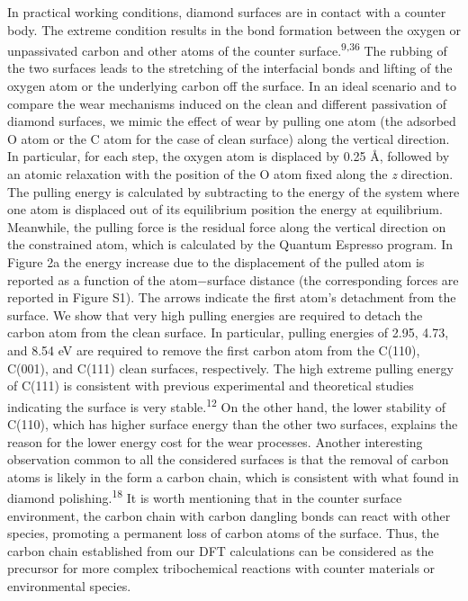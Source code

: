 \documentclass{article}
\begin{document}
In practical working conditions, diamond surfaces are in contact with a counter body. The extreme condition results in the bond formation between the oxygen or unpassivated carbon and other atoms of the counter surface.\textsuperscript{9,36} The rubbing of the two surfaces leads to the stretching of the interfacial bonds and lifting of the oxygen atom or the underlying carbon off the surface. In an ideal scenario and to compare the wear mechanisms induced on the clean and different passivation of diamond surfaces, we mimic the effect of wear by pulling one atom (the adsorbed O atom or the C atom for the case of clean surface) along the vertical direction. In particular, for each step, the oxygen atom is displaced by 0.25 Å, followed by an atomic relaxation with the position of the O atom fixed along the \textit{z} direction. The pulling energy is calculated by subtracting to the energy of the system where one atom is displaced out of its equilibrium position the energy at equilibrium. Meanwhile, the pulling force is the residual force along the vertical direction on the constrained atom, which is calculated by the Quantum Espresso program. In Figure 2a the energy increase due to the displacement of the pulled atom is reported as a function of the atom−surface distance (the corresponding forces are reported in Figure S1). The arrows indicate the first atom’s detachment from the surface. We show that very high pulling energies are required to detach the carbon atom from the clean surface. In particular, pulling energies of 2.95, 4.73, and 8.54 eV are required to remove the first carbon atom from the C(110), C(001), and C(111) clean surfaces, respectively. The high extreme pulling energy of C(111) is consistent with previous experimental and theoretical studies indicating the surface is very stable.\textsuperscript{12} On the other hand, the lower stability of C(110), which has higher surface energy than the other two surfaces, explains the reason for the lower energy cost for the wear processes. Another interesting observation common to all the considered surfaces is that the removal of carbon atoms is likely in the form a carbon chain, which is consistent with what found in diamond polishing.\textsuperscript{18} It is worth mentioning that in the counter surface environment, the carbon chain with carbon dangling bonds can react with other species, promoting a permanent loss of carbon atoms of the surface. Thus, the carbon chain established from our DFT calculations can be considered as the precursor for more complex tribochemical reactions with counter materials or environmental species.
\end{document}
